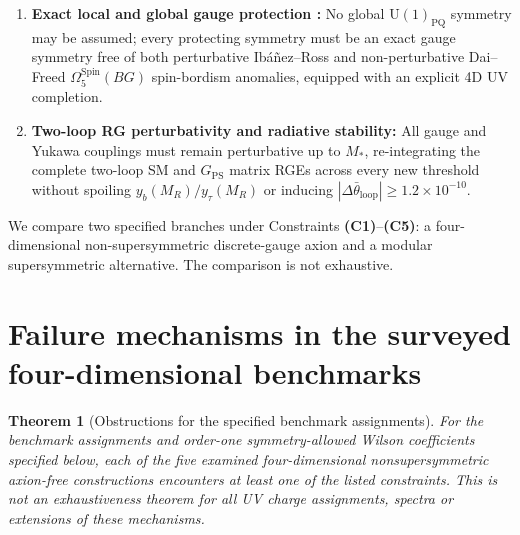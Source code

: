 \documentclass[11pt,a4paper]{article}
\newtheorem{theorem}{Theorem}[section]
\begin{document}
\begin{enumerate}[label=\textbf{(C\arabic*)},leftmargin=2.4em,itemsep=2pt]
\item \textbf{Exact local and global gauge protection \cite{IbanezRoss1991,Hsieh2018,GarciaEtxebarriaMontero2019}:} No global $\mathrm{U}(1)_{\mathrm{PQ}}$ symmetry may be assumed; every protecting symmetry must be an exact gauge symmetry free of both perturbative Ib\'a\~nez--Ross and non-perturbative Dai--Freed $\Omega_5^{\mathrm{Spin}}(BG)$ spin-bordism anomalies, equipped with an explicit 4D UV completion.
\item \textbf{Two-loop RG perturbativity and radiative stability:} All gauge and Yukawa couplings must remain perturbative up to $M_*$, re-integrating the complete two-loop SM and $G_{\mathrm{PS}}$ matrix RGEs across every new threshold without spoiling $y_b(M_R)/y_\tau(M_R)$ or inducing $|\Delta\bar{\theta}_{\mathrm{loop}}| \ge 1.2\times 10^{-10}$.
\end{enumerate}

We compare two specified branches under Constraints \textbf{(C1)}--\textbf{(C5)}: a four-dimensional non-supersymmetric discrete-gauge axion and a modular supersymmetric alternative. The comparison is not exhaustive.

\section{Failure mechanisms in the surveyed four-dimensional benchmarks}
\label{sec:nogo}

\begin{theorem}[Obstructions for the specified benchmark assignments]
\label{thm:nogo}
For the benchmark assignments and order-one symmetry-allowed Wilson coefficients specified below, each of the five examined four-dimensional nonsupersymmetric axion-free constructions encounters at least one of the listed constraints. This is not an exhaustiveness theorem for all UV charge assignments, spectra or extensions of these mechanisms.
\end{theorem}
\end{document}
